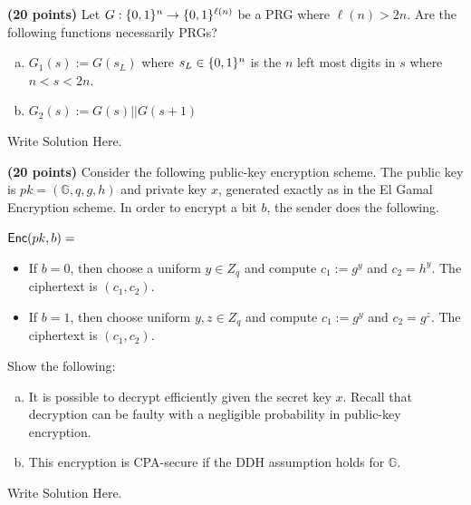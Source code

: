 \documentclass[12pt]{hw}
\newcommand{\Enc}{\ensuremath{{\sf Enc}}\xspace}
\begin{document}


\begin{exercise}
\textbf{(20 points)}
    Let $G: \{0,1\}^n \rightarrow \{0,1\}^{\ell(n)}$ be a PRG where $\ell(n) >2n$. Are the following functions necessarily PRGs?
    \begin{enumerate}[(a)]
        \item $G_1(s):= G(s_L)$ where $s_L \in \{0,1\}^n$ is the $n$ left most digits in $s$ where $n<s<2n$.
        \item $G_2(s):= G(s)||G(s+1)$ 
    \end{enumerate}
\end{exercise}

\begin{answer} 
 Write Solution Here.
\end{answer}


\begin{exercise}
\textbf{(20 points)}
Consider the following public-key encryption scheme. The public key is $pk =(\mathbb{G},q,g,h)$ and private key $x$, generated exactly as in the El Gamal Encryption scheme. In order to encrypt a bit $b$, the sender does the following.
\begin{mdframed}
$\Enc(pk,b)=$
    \begin{itemize}
    \item If $b=0$, then choose a uniform $y \in Z_q$ and compute $c_1 := g^y$ and $c_2 = h^y$. The ciphertext is $(c_1,c_2)$.
    \item If $b=1$, then choose uniform $y,z \in Z_q$ and compute $c_1 := g^y$ and $c_2 = g^z$. The ciphertext is $(c_1,c_2)$.
\end{itemize}
\end{mdframed}
Show the following:
\begin{enumerate}[(a)]
    \item It is possible to decrypt efficiently given the secret key $x.$ Recall that decryption can be faulty with a negligible probability in public-key encryption.
    \item This encryption is CPA-secure if the DDH assumption holds for $\mathbb{G}$.
\end{enumerate}
\end{exercise}
\begin{answer}
Write Solution Here.
\end{answer}
\end{document}
